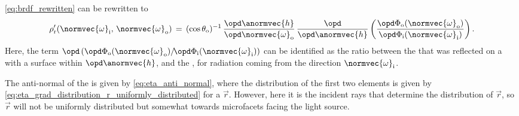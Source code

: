 \eqref{eq:brdf_rewritten} can be rewritten to
%
\begin{equation} \label{eq:brdf_from_ratio_between_fluxes}
\rho'_{\text{r}}(\normvec{\omega}_{\text{i}},\, \normvec{\omega}_{\text{o}}) \,=\, (\cos\theta_{\text{o}})^{-1}\, \frac{\opd \anormvec{h}}{\opd \normvec{\omega}_{\text{o}}}\,\frac{\opd}{\opd \anormvec{h}}\left(\frac{\opd \Phi_{\text{o}}(\normvec{\omega}_{\text{o}})}{\opd \Phi_{\text{i}}(\normvec{\omega}_{\text{i}})}\right).
\end{equation}
%
Here, the term $\opd\,(\opd \Phi_{\text{o}}(\normvec{\omega}_{\text{o}})/\!\opd \Phi_{\text{i}}(\normvec{\omega}_{\text{i}}))$ can be identified as the ratio between the  that was reflected on a \microfacet with a surface  within $\opd \anormvec{h}$, and the , for radiation coming from the direction $\normvec{\omega}_{\text{i}}$.

The anti-normal of the \microfacet is given by \eqref{eq:eta_anti_normal}, where the distribution of the first two elements is given by \eqref{eq:eta_grad_distribution_r_uniformly_distributed} for a  $\vec{r}$. However, here it is the incident rays that determine the distribution of $\vec{r}$, so $\vec{r}$ will not be uniformly distributed but somewhat \biased towards microfacets facing the light source.

